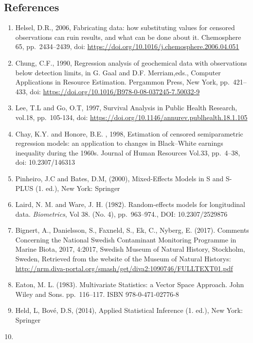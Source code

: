 \documentclass[]{article}
\begin{document}
\subsection{References}\label{references}

\begin{enumerate}
\def\labelenumi{\arabic{enumi})}
\item
  Helsel, D.R., 2006, Fabricating data: how substituting values for
  censored observations can ruin results, and what can be done about it.
  Chemosphere 65, pp.~2434--2439, doi:
  \url{https://doi.org/10.1016/j.chemosphere.2006.04.051}
\item
  Chung, C.F., 1990, Regression analysis of geochemical data with
  observations below detection limits, in G. Gaal and D.F. Merriam,eds.,
  Computer Applications in Resource Estimation. Pergammon Press, New
  York, pp.~421--433, doi:
  \url{https://doi.org/10.1016/B978-0-08-037245-7.50032-9}
\item
  Lee, T.L and Go, O.T, 1997, Survival Analysis in Public Health
  Research, vol.18, pp.~105-134, doi:
  \url{https://doi.org/10.1146/annurev.publhealth.18.1.105}
\item
  Chay, K.Y. and Honore, B.E. , 1998, Estimation of censored
  semiparametric regression models: an application to changes in
  Black--White earnings inequality during the 1960s. Journal of Human
  Resources Vol.33, pp.~4--38, doi: 10.2307/146313
\item
  Pinheiro, J.C and Bates, D.M, (2000), Mixed-Effects Models in S and
  S-PLUS (1. ed.), New York: Springer
\item
  Laird, N. M. and Ware, J. H. (1982). Random-effects models for
  longitudinal data. \emph{Biometrics}, Vol 38. (No. 4), pp.~963--974.,
  DOI: 10.2307/2529876
\item
  Bignert, A., Danielsson, S., Faxneld, S., Ek, C., Nyberg, E. (2017).
  Comments Concerning the National Swedish Contaminant Monitoring
  Programme in Marine Biota, 2017, 4:2017, Swedish Museum of Natural
  History, Stockholm, Sweden, Retrieved from the website of the Museum
  of Natural Historys:
  \url{http://nrm.diva-portal.org/smash/get/diva2:1090746/FULLTEXT01.pdf}
\item
  Eaton, M. L. (1983). Multivariate Statistics: a Vector Space Approach.
  John Wiley and Sons. pp.~116--117. ISBN 978-0-471-02776-8
\item
  Held, L, Bové, D.S, (2014), Applied Statistical Inference (1. ed.),
  New York: Springer
\item

\end{enumerate}
\end{document}
